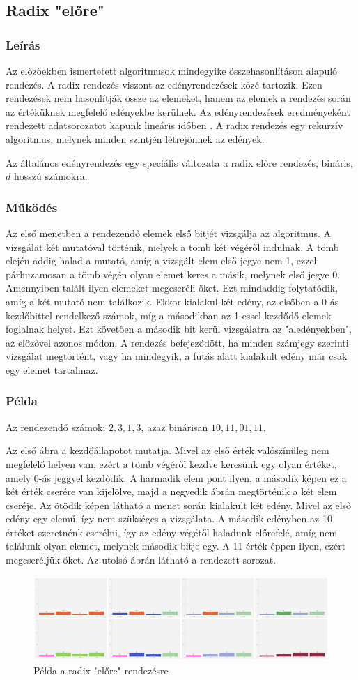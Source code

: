 \documentclass{elteikthesis}
\newcommand{\hiddensubsubsection}[1]{
	\stepcounter{subsubsection}
	\subsubsection*{{#1}}	
}
\begin{document}
\subsection{Radix "előre"}
\hiddensubsubsection{Leírás}
Az előzőekben ismertetett algoritmusok mindegyike összehasonlításon alapuló rendezés. A radix rendezés viszont az edényrendezések közé tartozik. Ezen rendezések nem hasonlítják össze az elemeket, hanem az elemek a rendezés során az értéküknek megfelelő edényekbe kerülnek. Az edényrendezések eredményeként rendezett adatsorozatot kapunk lineáris időben \cite{Ronyai}. 
A radix rendezés egy rekurzív algoritmus, melynek minden szintjén létrejönnek az edények.\par
Az általános edényrendezés egy speciális változata a radix előre rendezés, bináris, $d$ hosszú számokra.\par
\hiddensubsubsection{Működés}
Az első menetben a rendezendő elemek első bitjét vizsgálja az algoritmus. A vizsgálat két mutatóval történik, melyek a tömb két végéről indulnak. A tömb elején addig halad a mutató, amíg a vizsgált elem első jegye nem 1, ezzel párhuzamosan a tömb végén olyan elemet keres a másik, melynek első jegye 0. Amennyiben talált ilyen elemeket megcseréli őket. Ezt mindaddig folytatódik, amíg a két mutató nem találkozik. Ekkor kialakul két edény, az elsőben a 0-ás kezdőbittel rendelkező számok, míg a másodikban az 1-essel kezdődő elemek foglalnak helyet. Ezt követően a második bit kerül vizsgálatra az "aledényekben", az előzővel azonos módon. A rendezés befejeződött, ha minden számjegy szerinti vizsgálat megtörtént, vagy ha mindegyik, a futás alatt kialakult edény már csak egy elemet tartalmaz.
 \hiddensubsubsection{Példa}
 Az rendezendő számok: $2, 3, 1, 3$, azaz binárisan $10, 11, 01, 11$.\par
 Az első ábra a kezdőállapotot mutatja. Mivel az első érték valószínűleg nem megfelelő helyen van, ezért a tömb végéről kezdve keresünk egy olyan értéket, amely 0-ás jeggyel kezdődik. A harmadik elem pont ilyen, a második képen ez a két érték cserére van kijelölve, majd a negyedik ábrán megtörténik a két elem cseréje. Az ötödik képen látható a menet során kialakult két edény. Mivel az első edény egy elemű, így nem szükséges a vizsgálata. A második edényben az 10 értéket szeretnénk cserélni, így az edény végétől haladunk előrefelé, amíg nem találunk olyan elemet, melynek második bitje egy. A 11 érték éppen ilyen, ezért megcseréljük őket. Az utolsó ábrán látható a rendezett sorozat.\par
 \begin{figure}[H]
 	\centering
 	\includegraphics[width=1\textwidth]{pics/radixforward.jpg}
 	\caption{Példa a radix "előre" rendezésre}
 \end{figure}
\end{document}
